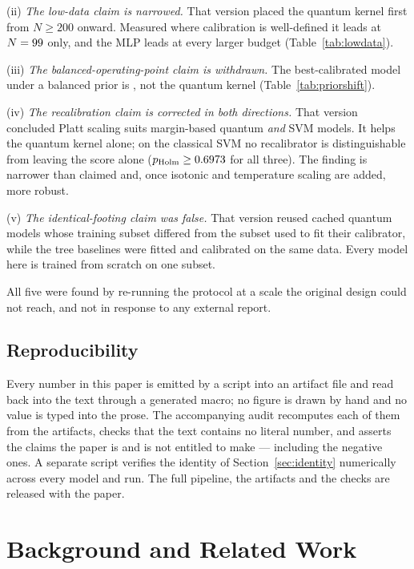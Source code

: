 \documentclass[journal]{IEEEtran}
\begin{document}
(ii) \emph{The low-data claim is narrowed.} That version placed the quantum
kernel first from $N\geq200$ onward. Measured where calibration is
well-defined it leads at $N=99$ only, and the MLP leads at every
larger budget (Table~\ref{tab:lowdata}).

(iii) \emph{The balanced-operating-point claim is withdrawn.} The
best-calibrated model under a balanced prior is \ppsBalWinner{}, not the
quantum kernel (Table~\ref{tab:priorshift}).

(iv) \emph{The recalibration claim is corrected in both directions.} That
version concluded Platt scaling suits margin-based quantum \emph{and} SVM
models. It helps the quantum kernel alone; on the classical SVM no
recalibrator is distinguishable from leaving the score alone
($p_{\text{Holm}}\geq0.6973$ for all three). The
finding is narrower than claimed and, once isotonic and temperature scaling
are added, more robust.

(v) \emph{The identical-footing claim was false.} That version reused cached
quantum models whose training subset differed from the subset used to fit
their calibrator, while the tree baselines were fitted and calibrated on the
same data. Every model here is trained from scratch on one subset.

All five were found by re-running the protocol at a scale the original
design could not reach, and not in response to any external report.

\subsection*{Reproducibility}
Every number in this paper is emitted by a script into an artifact file and
read back into the text through a generated macro; no figure is drawn by
hand and no value is typed into the prose. The accompanying audit
recomputes each of them from the artifacts, checks that the text contains no
literal number, and asserts the claims the paper is and is not entitled to
make --- including the negative ones. A separate script verifies the
identity of Section~\ref{sec:identity} numerically across every model and
run. The full pipeline, the artifacts and the checks are released with the
paper.

\section{Background and Related Work}\label{sec:related}
\end{document}

